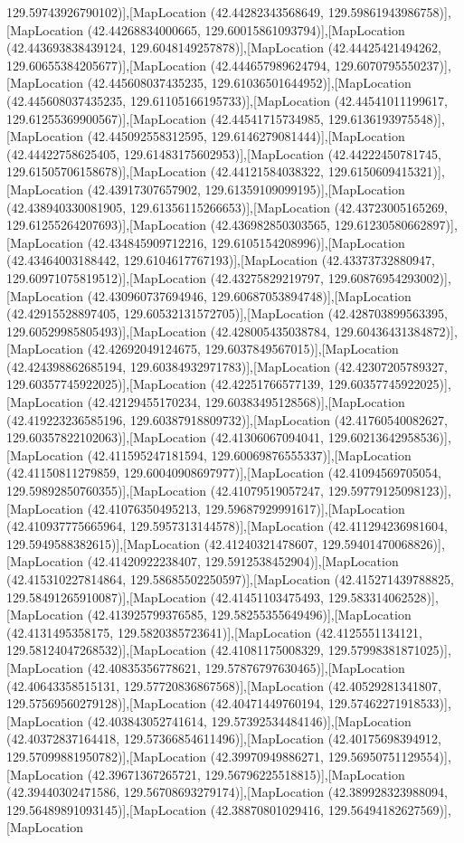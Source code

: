 129.59743926790102)],[MapLocation (42.44282343568649, 129.59861943986758)],[MapLocation (42.44268834000665, 129.60015861093794)],[MapLocation (42.443693838439124, 129.6048149257878)],[MapLocation (42.44425421494262, 129.60655384205677)],[MapLocation (42.444657989624794, 129.6070795550237)],[MapLocation (42.445608037435235, 129.61036501644952)],[MapLocation (42.445608037435235, 129.61105166195733)],[MapLocation (42.44541011199617, 129.61255369900567)],[MapLocation (42.44541715734985, 129.6136193975548)],[MapLocation (42.445092558312595, 129.6146279081444)],[MapLocation (42.44422758625405, 129.61483175602953)],[MapLocation (42.44222450781745, 129.61505706158678)],[MapLocation (42.44121584038322, 129.6150609415321)],[MapLocation (42.43917307657902, 129.61359109099195)],[MapLocation (42.438940330081905, 129.61356115266653)],[MapLocation (42.43723005165269, 129.61255264207693)],[MapLocation (42.436982850303565, 129.61230580662897)],[MapLocation (42.434845909712216, 129.6105154208996)],[MapLocation (42.43464003188442, 129.6104617767193)],[MapLocation (42.43373732880947, 129.60971075819512)],[MapLocation (42.43275829219797, 129.60876954293002)],[MapLocation (42.430960737694946, 129.60687053894748)],[MapLocation (42.42915528897405, 129.60532131572705)],[MapLocation (42.428703899563395, 129.60529985805493)],[MapLocation (42.428005435038784, 129.60436431384872)],[MapLocation (42.42692049124675, 129.6037849567015)],[MapLocation (42.424398862685194, 129.60384932971783)],[MapLocation (42.42307205789327, 129.60357745922025)],[MapLocation (42.42251766577139, 129.60357745922025)],[MapLocation (42.42129455170234, 129.60383495128568)],[MapLocation (42.419223236585196, 129.60387918809732)],[MapLocation (42.41760540082627, 129.60357822102063)],[MapLocation (42.41306067094041, 129.60213642958536)],[MapLocation (42.411595247181594, 129.60069876555337)],[MapLocation (42.41150811279859, 129.60040908697977)],[MapLocation (42.41094569705054, 129.59892850760355)],[MapLocation (42.41079519057247, 129.59779125098123)],[MapLocation (42.41076350495213, 129.59687929991617)],[MapLocation (42.410937775665964, 129.5957313144578)],[MapLocation (42.411294236981604, 129.5949588382615)],[MapLocation (42.41240321478607, 129.59401470068826)],[MapLocation (42.41420922238407, 129.5912538452904)],[MapLocation (42.415310227814864, 129.58685502250597)],[MapLocation (42.415271439788825, 129.58491265910087)],[MapLocation (42.41451103475493, 129.583314062528)],[MapLocation (42.413925799376585, 129.58255355649496)],[MapLocation (42.4131495358175, 129.5820385723641)],[MapLocation (42.4125551134121, 129.58124047268532)],[MapLocation (42.41081175008329, 129.57998381871025)],[MapLocation (42.40835356778621, 129.57876797630465)],[MapLocation (42.40643358515131, 129.57720836867568)],[MapLocation (42.40529281341807, 129.57569560279128)],[MapLocation (42.40471449760194, 129.57462271918533)],[MapLocation (42.403843052741614, 129.57392534484146)],[MapLocation (42.40372837164418, 129.57366854611496)],[MapLocation (42.40175698394912, 129.57099881950782)],[MapLocation (42.39970949886271, 129.56950751129554)],[MapLocation (42.39671367265721, 129.56796225518815)],[MapLocation (42.39440302471586, 129.56708693279174)],[MapLocation (42.389928323988094, 129.56489891093145)],[MapLocation (42.38870801029416, 129.56494182627569)],[MapLocation 
